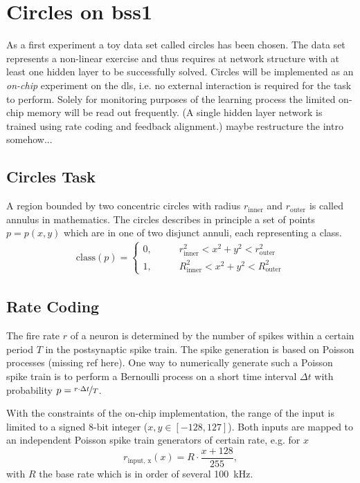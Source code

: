 \section{Circles on \gls{bss1}}
As a first experiment a toy data set called circles has been chosen. The data set represents a non-linear exercise and thus requires at network structure with at least one hidden layer to be successfully solved. Circles will be implemented as an \textit{on-chip} experiment on the \gls{dls}, i.e. no external interaction is required for the task to perform. Solely for monitoring purposes of the learning process the limited on-chip memory will be read out frequently. (A single hidden layer network is trained using rate coding and feedback alignment.) maybe restructure the intro somehow...

\subsection{Circles Task}
A region bounded by two concentric circles with radius $r_{\text{inner}}$ and $r_{\text{outer}}$ is called annulus in mathematics. The circles describes in principle a set of points $p = p(x,y)$ which are in one of two disjunct annuli, each representing a class.
\begin{align}
\text{class}(p) =
	\begin{cases}
		0 ,&\quad \quad r_{\text{inner}}^2 < x^2 + y^2 < r_{\text{outer}}^2 \\
		1 ,&\quad \quad R_{\text{inner}}^2 < x^2 + y^2 < R_{\text{outer}}^2
	\end{cases}
\end{align}

\subsection{Rate Coding}
The fire rate $r$ of a neuron is determined by the number of spikes within a certain period $T$ in the postsynaptic spike train. The spike generation is based on Poisson processes (missing ref here). One way to numerically generate such a Poisson spike train is to perform a Bernoulli process on a short time interval $\Delta t$ with probability $p = \nicefrac{r \cdot \Delta t}{T}$.

With the constraints of the on-chip implementation, the range of the input is limited to a signed 8-bit integer ($x, y \in [-128,127]$). Both inputs are mapped to an independent Poisson spike train generators of certain rate, e.g. for $x$
\begin{equation}\label{key}
r_{\text{input, x}}(x) = R \cdot \frac{x + 128}{255},
\end{equation}
with $R$ the base rate which is in order of several \SI{100}{\kilo \Hz}. 

